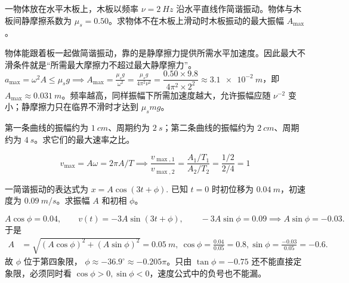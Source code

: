\begin{exercise}[木板简谐振动时物体不滑的最大振幅]
一物体放在水平木板上，木板以频率 \(\nu=\SI{2}{Hz}\) 沿水平直线作简谐振动。物体与木板间静摩擦系数为 \(\mu_s=0.50\)。求物体不在木板上滑动时木板振动的最大振幅 \(A_{\max}\)。
\end{exercise}
\begin{solution}
物体能跟着板一起做简谐振动，靠的是静摩擦力提供所需水平加速度。因此最大不滑条件就是“所需最大摩擦力不超过最大静摩擦力”。
 \(a_{\max}=\omega^2A\le \mu_sg \implies A_{\max}=\frac{\mu_s g}{\omega^2} =\frac{\mu_s g}{4\pi^2\nu^2}=\dfrac{0.50\times9.8}{4\pi^2\times2^2}\approx \SI{3.1e-2}{m}\)，即 \(A_{\max}\approx\SI{0.031}{m}\)。频率越高，同样振幅下所需加速度越大，允许振幅应随 \(\nu^{-2}\) 变小；静摩擦力只在临界不滑时才达到 \(\mu_smg\)。
\end{solution}

\begin{exercise}[由振动曲线判断最大速率比]
第一条曲线的振幅约为 \(\SI{1}{cm}\)、周期约为 \(\SI{2}{s}\)；第二条曲线的振幅约为 \(\SI{2}{cm}\)、周期约为 \(\SI{4}{s}\)。求它们的最大速率之比。
\end{exercise}
\begin{solution}
\[v_{\max}=A\omega=2\pi A/T\implies\dfrac{v_{\max,1}}{v_{\max,2}}
=\dfrac{A_1/T_1}{A_2/T_2}
=\dfrac{1/2}{2/4}=1\]
\end{solution}

\begin{exercise}
一简谐振动的表达式为
 \(x=A\cos(3t+\phi).\) 
已知 \(t=0\) 时初位移为 \(\SI{0.04}{m}\)，初速度为 \(\SI{0.09}{m/s}\)。求振幅 \(A\) 和初相 \(\phi\)。
\end{exercise}
\begin{solution}
 \[A\cos\phi=0.04,\qquad v(t)=-3A\sin(3t+\phi),\qquad -3A\sin\phi=0.09 \implies A\sin\phi=-0.03.\] 
于是
\[
\begin{aligned}
A&=\sqrt{(A\cos\phi)^2+(A\sin\phi)^2}=\SI{0.05}{m},~\cos\phi=\frac{0.04}{0.05}=0.8,\sin\phi=\frac{-0.03}{0.05}=-0.6.
\end{aligned}
\]
故 \(\phi\) 位于第四象限，
\(\phi\approx -36.9^\circ\approx -0.205\pi\)。只由 \(\tan\phi=-0.75\) 还不能直接定象限，必须同时看 \(\cos\phi>0,\sin\phi<0\)，速度公式中的负号也不能漏。
\end{solution}

